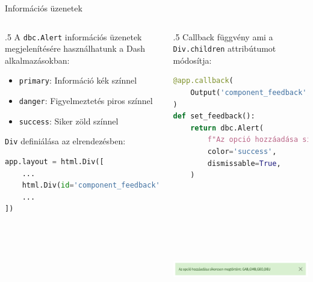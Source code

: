 \documentclass[english, aspectratio=169]{beamer}
\begin{document}
	\begin{frame}[fragile]{Információs üzenetek}
		\begin{columns}
			\begin{column}{.5\textwidth}
				A \texttt{dbc.Alert} információs üzenetek megjelenítésére használhatunk a Dash alkalmazásokban:
				\begin{itemize}
					\item \texttt{primary}: Információ kék színnel
					\item \texttt{danger}: Figyelmeztetés piros színnel
					\item \texttt{success}: Siker zöld színnel
				\end{itemize}
				\par\medskip
				\texttt{Div} definiálása az elrendezésben:
				\begin{lstlisting}[language=python]
app.layout = html.Div([
	...
	html.Div(id='component_feedback'),
	...
])
				\end{lstlisting}
			\end{column}
			\begin{column}{.5\textwidth}
				Callback függvény ami a \texttt{Div.children} attribútumot módosítja: 
				\begin{lstlisting}[language=python]
@app.callback(
	Output('component_feedback', 'children')
)
def set_feedback():
	return dbc.Alert(
		f"Az opció hozzáadása sikeresen megtörtént: {','.join(text)}",
		color='success',
		dismissable=True,
	)
				\end{lstlisting}
				\par\smallskip
				\begin{center}
					\includegraphics[width=7cm, height=7cm, keepaspectratio]{images/freq_25.png}
				\end{center}
			\end{column}
		\end{columns}
	\end{frame}
	
\end{document}
